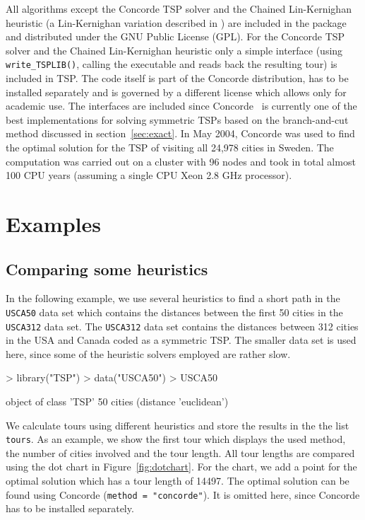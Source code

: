 \documentclass[10pt,a4paper,fleqn]{article}
\newcommand{\strong}[1]{{\normalfont\fontseries{b}\selectfont #1}}
\newcommand{\func}[1]{\mbox{\texttt{#1()}}}
\newcommand{\code}[1]{\mbox{\texttt{#1}}}
\newcommand{\pkg}[1]{\strong{#1}}
\begin{document}
All algorithms except the Concorde TSP solver and the Chained
Lin-Kernighan heuristic (a Lin-Kernighan variation described in
\cite{Applegate2003}) are included in the package and distributed under
the GNU Public License (GPL). For the Concorde TSP solver and the
Chained Lin-Kernighan heuristic only a simple interface (using
\func{write\_TSPLIB}, calling the executable and reads back the
resulting tour) is included in \pkg{TSP}.  The code itself is part of
the Concorde distribution, has to be installed separately and is
governed by a different license which allows only for academic use.  The
interfaces are included since
Concorde~\citep{Applegate2000,Applegate2006} is currently one of the
best implementations for solving symmetric TSPs based on the
branch-and-cut method discussed in section~\ref{sec:exact}.  In May
2004, Concorde was used to find the optimal solution for the TSP of
visiting all 24,978 cities in Sweden.  The computation was carried out
on a cluster with 96 nodes and took in total almost 100 CPU years
(assuming a single CPU Xeon 2.8 GHz processor).

\section{Examples}\label{sec:examples}

\subsection{Comparing some heuristics}

In the following example, we use several heuristics to find a short path
in the \code{USCA50} data set which contains the distances between the
first 50 cities in the \code{USCA312} data set. The \code{USCA312} data
set contains the distances between 312 cities in the USA and Canada
coded as a symmetric TSP.  The smaller data set is used here, since some
of the heuristic solvers employed are rather slow.

\begin{Schunk}
\begin{Sinput}
> library("TSP")
> data("USCA50")
> USCA50
\end{Sinput}
\begin{Soutput}
object of class 'TSP' 
50 cities (distance 'euclidean') 
\end{Soutput}
\end{Schunk}


We calculate tours using different heuristics and store the results in the the
list \code{tours}. As an example, we show the first tour which displays the
used method, the number of cities involved and the tour length.  All tour
lengths are compared using the dot chart in Figure~\ref{fig:dotchart}.  For the
chart, we add a point for the optimal solution which has a tour length of
14497. The optimal solution can be found using Concorde (\code{method =
"concorde"}).  It is omitted here, since Concorde has to be installed
separately.
\end{document}
